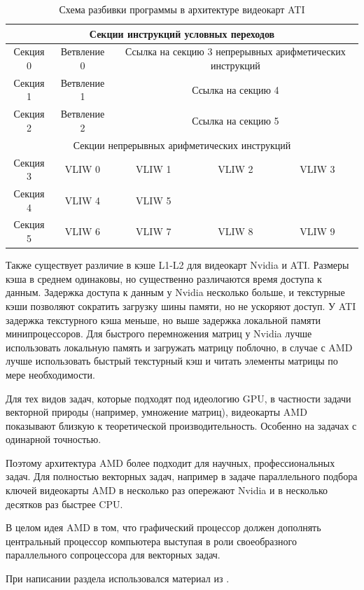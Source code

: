 \begin{table}
\begin{center}
\begin{tabular}{|c|c|c|c|c|}
\hline
\multicolumn{5}{|c|}{Секции инструкций условных переходов} \\
\hline
Секция 0 & Ветвление 0 & \multicolumn{3}{|p{7cm}|}{Ссылка на секцию 3 непрерывных арифметических инструкций} \\ \hline
Секция 1 & Ветвление 1 & \multicolumn{3}{|p{7cm}|}{Ссылка на секцию 4} \\ \hline
Секция 2 & Ветвление 2 & \multicolumn{3}{|p{7cm}|}{Ссылка на секцию 5} \\ \hline
\multicolumn{5}{|c|}{Секции непрерывных арифметических инструкций} \\ \hline
Секция 3 & VLIW 0 & VLIW 1 & VLIW 2 & VLIW 3 \\ \hline
Секция 4 & VLIW 4 & VLIW 5 & & \\ \hline
Секция 5 & VLIW 6 & VLIW 7 & VLIW 8 & VLIW 9 \\ \hline
\end{tabular}
\end{center}
\caption {Схема разбивки программы в архитектуре видеокарт ATI}
\label{table:instructions}
\end{table}

Также существует различие в кэше L1-L2 для видеокарт Nvidia и ATI. Размеры кэша в среднем одинаковы, но существенно различаются время доступа к данным. Задержка доступа к данным у Nvidia несколько больше, и текстурные кэши позволяют сократить загрузку шины памяти, но не ускоряют доступ. У ATI задержка текстурного кэша меньше, но выше задержка локальной памяти минипроцессоров. Для быстрого перемножения матриц у Nvidia лучше использовать локальную память и загружать матрицу поблочно, в случае с AMD лучше использовать быстрый текстурный кэш и читать элементы матрицы по мере необходимости.

Для тех видов задач, которые подходят под идеологию GPU, в частности задачи векторной природы (например, умножение матриц), видеокарты AMD показывают близкую к теоретической производительность. Особенно на задачах с одинарной точностью.

Поэтому архитектура AMD более подходит для научных, профессиональных задач. Для полностью векторных задач, например в задаче параллельного подбора ключей видеокарты AMD в несколько раз опережают Nvidia и в несколько десятков раз быстрее CPU.

В целом идея AMD в том, что графический процессор должен дополнять центральный процессор компьютера выступая в роли своеобразного параллельного сопроцессора для векторных задач.

При написании раздела использовался материал из \cite{amd}.

